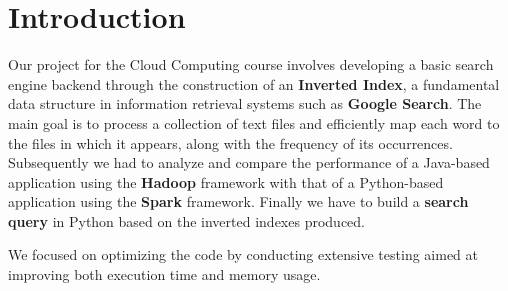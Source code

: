 \section{Introduction}
Our project for the Cloud Computing course involves developing a basic search engine backend through the construction of an \textbf{Inverted Index}, a fundamental data structure in information retrieval systems such as \textbf{Google Search}. The main goal is to process a collection of text files and efficiently map each word to the files in which it appears, along with the frequency of its occurrences. Subsequently we had to analyze and compare the performance of a Java-based application using the \textbf{Hadoop} framework with that of a Python-based application using the \textbf{Spark} framework. Finally we have to build a \textbf{search query} in Python based on the inverted indexes produced. 

We focused on optimizing the code by conducting extensive testing aimed at improving both execution time and memory usage.


